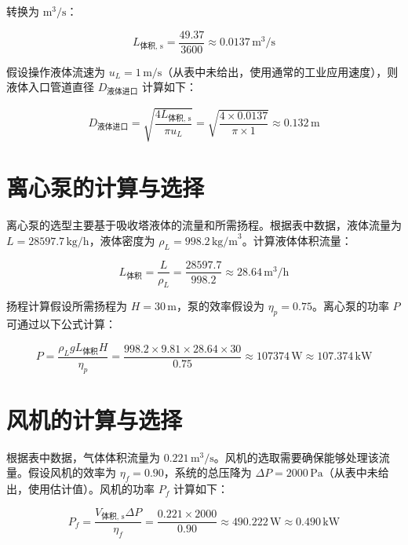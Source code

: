 转换为 $\text{m}^3/\text{s}$：

\begin{equation}
	L_{\text{体积, s}} = \frac{49.37}{3600} \approx 0.0137 \, \text{m}^3/\text{s}
\end{equation}

假设操作液体流速为 $u_L = 1 \, \text{m/s}$（从表中未给出，使用通常的工业应用速度），则液体入口管道直径 $D_{\text{液体进口}}$ 计算如下：

\begin{equation}
	D_{\text{液体进口}} = \sqrt{\frac{4L_{\text{体积, s}}}{\pi u_L}} = \sqrt{\frac{4 \times 0.0137}{\pi \times 1}} \approx 0.132 \, \text{m}
\end{equation}

\section{离心泵的计算与选择}

离心泵的选型主要基于吸收塔液体的流量和所需扬程。根据表中数据，液体流量为 $L = 28597.7 \, \text{kg/h}$，液体密度为 $\rho_L = 998.2 \, \text{kg/m}^3$。计算液体体积流量：

\begin{equation}
	L_{\text{体积}} = \frac{L}{\rho_L} = \frac{28597.7}{998.2} \approx 28.64 \, \text{m}^3/\text{h}
\end{equation}

扬程计算假设所需扬程为 $H = 30 \, \text{m}$，泵的效率假设为 $\eta_p = 0.75$。离心泵的功率 $P$ 可通过以下公式计算：

\begin{equation}
	P = \frac{\rho_L g L_{\text{体积}} H}{\eta_p} = \frac{998.2 \times 9.81 \times 28.64 \times 30}{0.75} \approx 107374 \, \text{W} \approx 107.374 \, \text{kW}
\end{equation}

\section{风机的计算与选择}

根据表中数据，气体体积流量为 $0.221 \, \text{m}^3/\text{s}$。风机的选取需要确保能够处理该流量。假设风机的效率为 $\eta_f = 0.90$，系统的总压降为 $\Delta P = 2000 \, \text{Pa}$（从表中未给出，使用估计值）。风机的功率 $P_f$ 计算如下：

\begin{equation}
	P_f = \frac{V_{\text{体积, s}} \Delta P}{\eta_f} = \frac{0.221 \times 2000}{0.90} \approx 490.222 \, \text{W} \approx 0.490 \, \text{kW}
\end{equation}